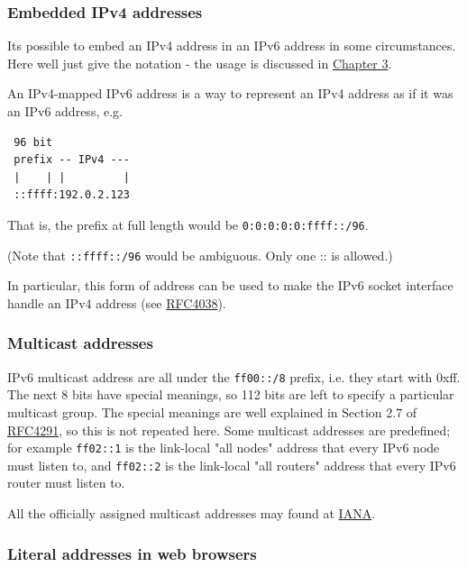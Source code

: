 \documentclass[
]{article}
\begin{document}
\subsubsection{Embedded IPv4 addresses}\label{embedded-ipv4-addresses}

It\textquotesingle s possible to embed an IPv4 address in an IPv6
address in some circumstances. Here we\textquotesingle ll just give the
notation - the usage is discussed in
\href{https://github.com/becarpenter/book6/tree/main/3.\%20Coexistence\%20with\%20legacy\%20IPv4}{Chapter
3}.

An IPv4-mapped IPv6 address is a way to represent an IPv4 address as if
it was an IPv6 address, e.g.

\begin{verbatim}
 96 bit
 prefix -- IPv4 ---
 |    | |         |
 ::ffff:192.0.2.123
\end{verbatim}

That is, the prefix at full length would be
\texttt{0:0:0:0:0:ffff::/96}.

(Note that \texttt{::ffff::/96} would be ambiguous. Only one
\textquotesingle::\textquotesingle{} is allowed.)

In particular, this form of address can be used to make the IPv6 socket
interface handle an IPv4 address (see
\href{https://www.rfc-editor.org/info/rfc4038}{RFC4038}).

\subsubsection{Multicast addresses}\label{multicast-addresses}

IPv6 multicast address are all under the \texttt{ff00::/8} prefix, i.e.
they start with 0xff. The next 8 bits have special meanings, so 112 bits
are left to specify a particular multicast group. The special meanings
are well explained in Section 2.7 of
\href{http://www.rfc-editor.org/info/rfc4291}{RFC4291}, so this is not
repeated here. Some multicast addresses are predefined; for example
\texttt{ff02::1} is the link-local "all nodes" address that every IPv6
node must listen to, and \texttt{ff02::2} is the link-local "all
routers" address that every IPv6 router must listen to.

All the officially assigned multicast addresses may found at
\href{https://www.iana.org/assignments/ipv6-multicast-addresses/ipv6-multicast-addresses.xhtml\#link-local}{IANA}.

\subsubsection{Literal addresses in web
browsers}\label{literal-addresses-in-web-browsers}
\end{document}
